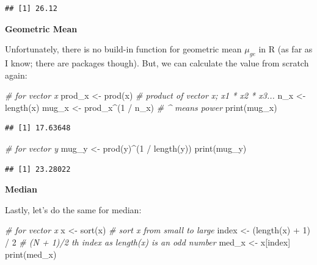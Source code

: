 \documentclass[
]{book}
\newenvironment{Shaded}{\begin{snugshade}}{\end{snugshade}}
\newcommand{\CommentTok}[1]{\textcolor[rgb]{0.56,0.35,0.01}{\textit{#1}}}
\newcommand{\DecValTok}[1]{\textcolor[rgb]{0.00,0.00,0.81}{#1}}
\newcommand{\FunctionTok}[1]{\textcolor[rgb]{0.00,0.00,0.00}{#1}}
\newcommand{\NormalTok}[1]{#1}
\newcommand{\OtherTok}[1]{\textcolor[rgb]{0.56,0.35,0.01}{#1}}
\newcommand{\SpecialCharTok}[1]{\textcolor[rgb]{0.00,0.00,0.00}{#1}}
\begin{document}
\begin{verbatim}
## [1] 26.12
\end{verbatim}

\textbf{Geometric Mean}

Unfortunately, there is no build-in function for geometric mean \(\mu_{ge}\) in R (as far as I know; there are packages though). But, we can calculate the value from scratch again:

\begin{Shaded}
\begin{Highlighting}[]
\CommentTok{\# for vector x}
\NormalTok{prod\_x }\OtherTok{\textless{}{-}} \FunctionTok{prod}\NormalTok{(x) }\CommentTok{\# product of vector x; x1 * x2 * x3...}
\NormalTok{n\_x }\OtherTok{\textless{}{-}} \FunctionTok{length}\NormalTok{(x)}
\NormalTok{mug\_x }\OtherTok{\textless{}{-}}\NormalTok{ prod\_x}\SpecialCharTok{\^{}}\NormalTok{(}\DecValTok{1} \SpecialCharTok{/}\NormalTok{ n\_x) }\CommentTok{\# \^{} means power}
\FunctionTok{print}\NormalTok{(mug\_x)}
\end{Highlighting}
\end{Shaded}

\begin{verbatim}
## [1] 17.63648
\end{verbatim}

\begin{Shaded}
\begin{Highlighting}[]
\CommentTok{\# for vector y}
\NormalTok{mug\_y }\OtherTok{\textless{}{-}} \FunctionTok{prod}\NormalTok{(y)}\SpecialCharTok{\^{}}\NormalTok{(}\DecValTok{1} \SpecialCharTok{/} \FunctionTok{length}\NormalTok{(y))}
\FunctionTok{print}\NormalTok{(mug\_y)}
\end{Highlighting}
\end{Shaded}

\begin{verbatim}
## [1] 23.28022
\end{verbatim}

\textbf{Median}

Lastly, let's do the same for median:

\begin{Shaded}
\begin{Highlighting}[]
\CommentTok{\# for vector x}
\NormalTok{x }\OtherTok{\textless{}{-}} \FunctionTok{sort}\NormalTok{(x) }\CommentTok{\# sort x from small to large}
\NormalTok{index }\OtherTok{\textless{}{-}}\NormalTok{ (}\FunctionTok{length}\NormalTok{(x) }\SpecialCharTok{+} \DecValTok{1}\NormalTok{) }\SpecialCharTok{/} \DecValTok{2} \CommentTok{\# (N + 1)/2 th index as length(x) is an odd number}
\NormalTok{med\_x }\OtherTok{\textless{}{-}}\NormalTok{ x[index]}
\FunctionTok{print}\NormalTok{(med\_x)}
\end{Highlighting}
\end{Shaded}
\end{document}
